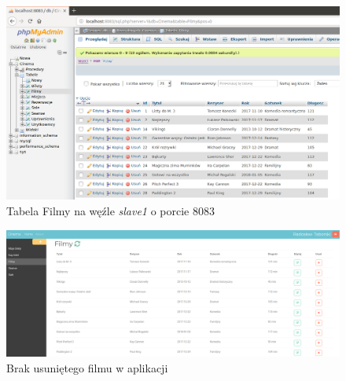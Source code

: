 \begin{figure} [H]
	\centering
	\includegraphics[width=1\linewidth]{rozdzial06/r3.png}
	\caption{Tabela Filmy na węźle \textit{slave1} o porcie 8083}
	\label{fig:FilmSlaveRemove}
\end{figure}

\begin{figure} [H]
	\centering
	\includegraphics[width=1\linewidth]{rozdzial06/r4.png}
	\caption{Brak usuniętego filmu w aplikacji}
	\label{fig:endRemoveFilm}
\end{figure}



